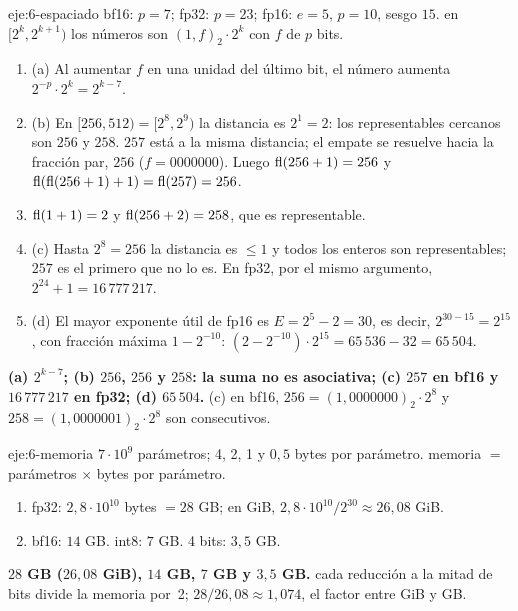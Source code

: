 \begin{solucion}{eje:6-espaciado}
\datos bf16: $p=7$; fp32: $p=23$; fp16: $e=5$, $p=10$, sesgo $15$.
\planteamiento en $[2^k,2^{k+1})$ los números son $(1{,}f)_2\cdot2^k$ con $f$ de $p$ bits.
\pasos
\begin{enumerate}[label=\arabic*.]
  \item (a) Al aumentar $f$ en una unidad del último bit, el número aumenta $2^{-p}\cdot2^k=2^{k-7}$.
  \item (b) En $[256,512)=[2^8,2^9)$ la distancia es $2^{1}=2$: los representables cercanos son $256$ y $258$. $257$ está a la misma distancia; el empate se resuelve hacia la fracción par, $256$ ($f=0000000$). Luego $\operatorname{fl}(256+1)=256$ y $\operatorname{fl}(\operatorname{fl}(256+1)+1)=\operatorname{fl}(257)=256$.
  \item $\operatorname{fl}(1+1)=2$ y $\operatorname{fl}(256+2)=258$, que es representable.
  \item (c) Hasta $2^8=256$ la distancia es $\le1$ y todos los enteros son representables; $257$ es el primero que no lo es. En fp32, por el mismo argumento, $2^{24}+1=16\,777\,217$.
  \item (d) El mayor exponente útil de fp16 es $E=2^5-2=30$, es decir, $2^{30-15}=2^{15}$, con fracción máxima $1-2^{-10}$: $(2-2^{-10})\cdot2^{15}=65\,536-32=65\,504$.
\end{enumerate}
\resultado \textbf{(a) $2^{k-7}$; (b) $256$, $256$ y $258$: la suma no es asociativa; (c) $257$ en bf16 y $16\,777\,217$ en fp32; (d) $65\,504$.}
\comprobacion (c) en bf16, $256=(1{,}0000000)_2\cdot2^8$ y $258=(1{,}0000001)_2\cdot2^8$ son consecutivos.
\end{solucion}

\begin{solucion}{eje:6-memoria}
\datos $7\cdot10^9$ parámetros; 4, 2, 1 y $0{,}5$ bytes por parámetro.
\planteamiento memoria $=$ parámetros $\times$ bytes por parámetro.
\pasos
\begin{enumerate}[label=\arabic*.]
  \item fp32: $2{,}8\cdot10^{10}$ bytes $=28$ GB; en GiB, $2{,}8\cdot10^{10}/2^{30}\approx26{,}08$ GiB.
  \item bf16: $14$ GB. int8: $7$ GB. 4 bits: $3{,}5$ GB.
\end{enumerate}
\resultado \textbf{$28$ GB ($26{,}08$ GiB), $14$ GB, $7$ GB y $3{,}5$ GB.}
\comprobacion cada reducción a la mitad de bits divide la memoria por~2; $28/26{,}08\approx1{,}074$, el factor entre GiB y GB.
\end{solucion}


